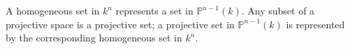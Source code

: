 A homogeneous set in $k^n$ represents a set in $\mathbb{P}^{n-1}(k)$. Any subset of a projective space is a projective set; a projective set in $\mathbb{P}^{n-1}(k)$ is represented by the corresponding homogeneous set in $k^n$.
